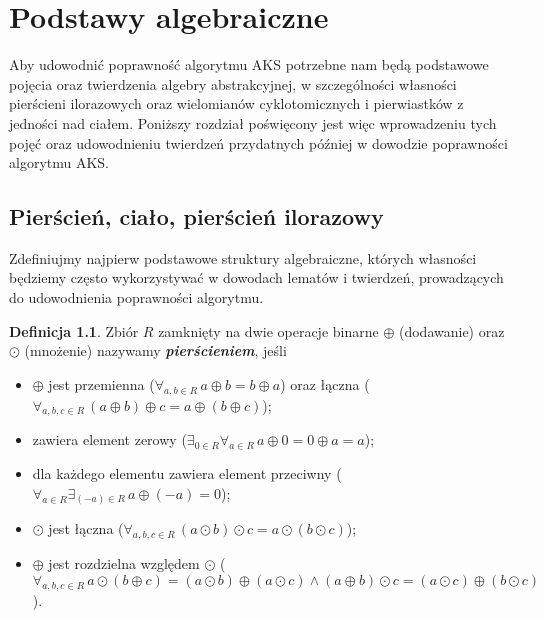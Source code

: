 \documentclass[polish,declaration,shortabstract]{iithesis}
\theoremstyle{definition}
\newtheorem{definition}{Definicja}
\theoremstyle{remark} \newtheorem{observation}{Obserwacja}
\theoremstyle{plain} \newtheorem{theorem}{Twierdzenie}
\theoremstyle{plain} \newtheorem{lemma}{Lemat}
\theoremstyle{remark} \newtheorem*{remark*}{Uwaga}
\theoremstyle{reminder} \newtheorem*{reminder*}{Przypomnienie}
\begin{document}


\chapter{Podstawy algebraiczne}

Aby udowodnić poprawność algorytmu AKS potrzebne nam będą podstawowe pojęcia oraz twierdzenia algebry abstrakcyjnej, w szczególności własności pierścieni ilorazowych oraz wielomianów cyklotomicznych i pierwiastków z jedności nad ciałem. Poniższy rozdział poświęcony jest więc wprowadzeniu tych pojęć oraz udowodnieniu twierdzeń przydatnych później w dowodzie poprawności algorytmu AKS.

\section{Pierścień, ciało, pierścień ilorazowy}

Zdefiniujmy najpierw podstawowe struktury algebraiczne, których własności będziemy często wykorzystywać w dowodach lematów i twierdzeń, prowadzących do udowodnienia poprawności algorytmu.

\theoremstyle{definition} 
\begin{definition}
	Zbiór $R$ zamknięty na dwie operacje binarne $\oplus$ (dodawanie) oraz $\odot$ (mnożenie) nazywamy \textit{\textbf{pierścieniem}}, jeśli 
	\begin{itemize}[leftmargin=.4in]
		\item $\oplus$ jest przemienna ($\forall_{a, b \in R} \, a \oplus b = b \oplus a$) oraz łączna ($\forall_{a, b, c \in R} \, (a \oplus b) \oplus c = a \oplus (b \oplus c)$);
		\item zawiera element zerowy ($\exists_{0 \in R} \forall_{a \in R} \, a \oplus 0 = 0 \oplus a = a$);
		\item dla każdego elementu zawiera element przeciwny ($\forall_{a \in R} \exists_{(-a) \in R} \, a \oplus (-a) = 0$);
		\item $\odot$ jest łączna ($\forall_{a, b, c \in R} \, (a \odot b) \odot c = a \odot (b \odot c)$);
		\item $\oplus$ jest rozdzielna względem $\odot$ ($\forall_{a, b, c \in R} \, a \odot (b \oplus c) = (a \odot b) \oplus (a \odot c) \wedge (a \oplus b) \odot c = (a \odot c) \oplus (b \odot c)$).
	\end{itemize}
\end{definition}
\end{document}
